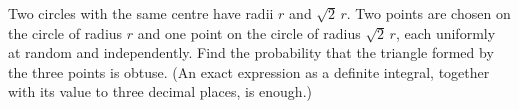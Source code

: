 Two circles with the same centre have radii $r$ and $\sqrt2\,r$. Two points are chosen on the circle of radius $r$ and one point on the circle of radius $\sqrt2\,r$, each uniformly at random and independently. Find the probability that the triangle formed by the three points is obtuse. (An exact expression as a definite integral, together with its value to three decimal places, is enough.)
